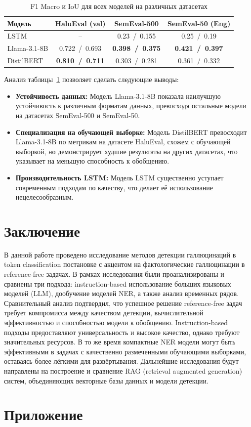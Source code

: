 \documentclass[12pt]{article}
\begin{document}
\begin{table}[ht]
    \centering
    \begin{tabular}{lccc}
        \toprule
        \textbf{Модель} & \textbf{HaluEval} (val) & \textbf{SemEval-500} & \textbf{SemEval-50} (Eng) \\
        \midrule
        LSTM & -- & 0.23~/~0.155 & 0.25~/~0.19 \\
        Llama-3.1-8B & 0.722~/~0.693 & \textbf{0.398~/~0.375} & \textbf{0.421~/~0.397} \\
        DistilBERT & \textbf{0.810~/~0.711} & 0.303~/~0.281 & 0.361~/~0.332 \\
        \bottomrule
    \end{tabular}
    \caption{F1 Macro и IoU для всех моделей на различных датасетах}
    \label{tab:comparison}
\end{table}

Анализ таблицы~\ref{tab:comparison} позволяет сделать следующие выводы:
\begin{itemize}
    \item \textbf{Устойчивость данных:} Модель Llama-3.1-8B показала наилучшую устойчивость к различным форматам данных, превосходя остальные модели на датасетах SemEval-500 и SemEval-50.
    \item \textbf{Специализация на обучающей выборке:} Модель DistilBERT превосходит Llama-3.1-8B по метрикам на датасете HaluEval, схожем с обучающей выборкой, но демонстрирует худшие результаты на других датасетах, что указывает на меньшую способность к обобщению.
    \item \textbf{Производительность LSTM:} Модель LSTM существенно уступает современным подходам по качеству, что делает её использование нецелесообразным.
\end{itemize}

 
\section{Заключение}

В данной работе проведено исследование методов детекции галлюцинаций в token classification постановке с акцентом на фактологические галлюцинации в reference-free задачах. В рамках исследования были проанализированы и сравнены три подхода: instruction-based использование больших языковых моделей (LLM), дообучение моделей NER, а также анализ временных рядов. Сравнительный анализ подтвердил, что успешное решение reference-free задач требует компромисса между качеством детекции, вычислительной эффективностью и способностью модели к обобщению. Instruction-based подходы предоставляют универсальность и высокое качество, однако требуют значительных ресурсов. В то же время компактные NER модели могут быть эффективными в задачах с качественно размеченными обучающими выборками, оставаясь более лёгкими для развёртывания. Дальнейшие исследования будут направлены на построение и сравнение RAG (retrieval augmented generation) систем, объединяющих векторные базы данных и модели детекции.




 
\section{Приложение}
\end{document}
